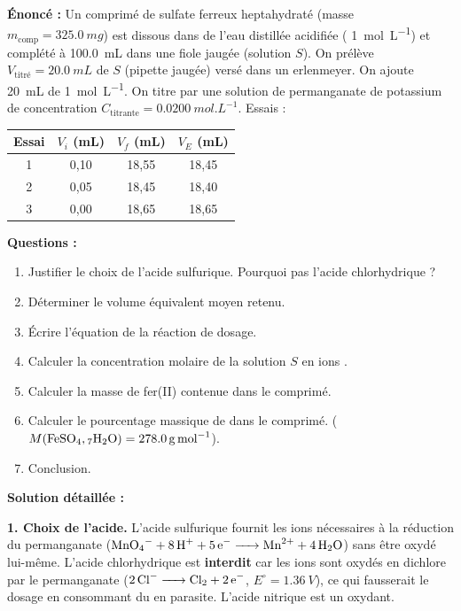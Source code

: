 \documentclass[11pt]{article}
\begin{document}
\begin{exoresolu}
\textbf{Énoncé :} Un comprimé de sulfate ferreux heptahydraté  (masse $m_{\text{comp}} = \SI{325,0}{mg}$) est dissous dans de l'eau distillée acidifiée ( \SI{1}{mol.L^{-1}}) et complété à \SI{100,0}{mL} dans une fiole jaugée (solution $S$). On prélève $V_{\text{titré}} = \SI{20,0}{mL}$ de $S$ (pipette jaugée) versé dans un erlenmeyer. On ajoute \SI{20}{mL} de  \SI{1}{mol.L^{-1}}. On titre par une solution de permanganate de potassium de concentration $C_{\text{titrante}} = \SI{0,0200}{mol.L^{-1}}$.
Essais : 
\begin{center}
\begin{tabular}{|c|c|c|c|}\hline
Essai & $V_i$ (mL) & $V_f$ (mL) & $V_E$ (mL) \\ \hline
1 & 0,10 & 18,55 & 18,45 \\ \hline
2 & 0,05 & 18,45 & 18,40 \\ \hline
3 & 0,00 & 18,65 & 18,65 \\ \hline
\end{tabular}
\end{center}
\textbf{Questions :}
\begin{enumerate}
\item Justifier le choix de l'acide sulfurique. Pourquoi pas l'acide chlorhydrique ?
\item Déterminer le volume équivalent moyen retenu.
\item Écrire l'équation de la réaction de dosage.
\item Calculer la concentration molaire de la solution $S$ en ions .
\item Calculer la masse de fer(II) contenue dans le comprimé.
\item Calculer le pourcentage massique de  dans le comprimé. ($M(\ce{FeSO4,7H2O}) = \SI{278,0}{g.mol^{-1}}$).
\item Conclusion.
\end{enumerate}
\tcblower
\textbf{Solution détaillée :}

\textbf{1. Choix de l'acide.}
L'acide sulfurique  fournit les ions  nécessaires à la réduction du permanganate ($\ce{MnO4- + 8H+ + 5e- -> Mn^2+ + 4H2O}$) sans être oxydé lui-même. L'acide chlorhydrique  est \textbf{interdit} car les ions  sont oxydés en dichlore  par le permanganate ($\ce{2Cl- -> Cl2 + 2e-}$, $E^\circ = \SI{1,36}{V}$), ce qui fausserait le dosage en consommant du  en parasite. L'acide nitrique  est un oxydant.


\end{exoresolu}
\end{document}

